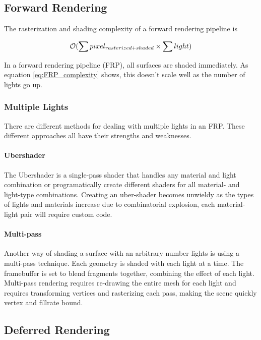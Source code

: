\subsection{Forward Rendering}

The rasterization and shading complexity of a forward rendering pipeline is

\begin{equation}\label{eq:FRP_complexity}
  \mathcal{O}(\sum {pixel_{rasterized + shaded}} \times \sum light)
\end{equation}

In a forward rendering pipeline (FRP), all surfaces are shaded immediately. As equation \eqref{eq:FRP_complexity} shows, this doesn't scale well as the number of lights go up.

\subsubsection{Multiple Lights}

There are different methods for dealing with multiple lights in an FRP. These different approaches all have their strengths and weaknesses.

\paragraph{Ubershader}

The Ubershader is a single-pass shader that handles any material and light combination or programatically create different shaders for all material- and light-type combinations. Creating an uber-shader becomes unwieldy as the types of lights and materials increase due to combinatorial explosion, each material-light pair will require custom code.

\paragraph{Multi-pass}

Another way of shading a surface with an arbitrary number lights is using a multi-pass technique. Each geometry is shaded with each light at a time. The framebuffer is set to blend fragments together, combining the effect of each light. Multi-pass rendering requires re-drawing the entire mesh for each light and requires transforming vertices and rasterizing each pass, making the scene quickly vertex and fillrate bound.

\subsection{Deferred Rendering}

